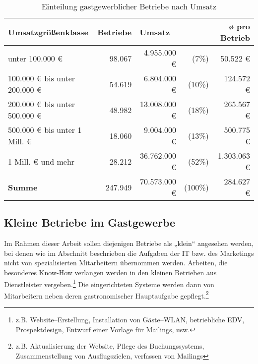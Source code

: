 \begin{table}[H]
\begin{center}
\begin{footnotesize}
\begin{tabular}{| l | r | r  r | r |}  \hline                       
  \textbf{Umsatzgrößenklasse}            & \textbf{Betriebe} & \multicolumn{2}{|l|}{\textbf{Umsatz}}  & \textbf{ø pro Betrieb} \\ \hline 
  unter 100.000 €               & 98.067   &  4.955.000 € &   (7\%) &    50.522 € \\  \hline  
  100.000 € bis unter 200.000 € & 54.619   &  6.804.000 € &  (10\%) &   124.572 € \\  \hline  
  200.000 € bis unter 500.000 € & 48.982   & 13.008.000 € &  (18\%) &   265.567 € \\  \hline  
  500.000 € bis unter 1 Mill. € & 18.060   &  9.004.000 € &  (13\%) &   500.775 € \\  \hline  
  1 Mill. € und mehr            & 28.212   & 36.762.000 € &  (52\%) & 1.303.063 € \\  \hline  
  \textbf{Summe}                         & 247.949  & 70.573.000 € & (100\%) &   284.627 € \\  \hline  
\end{tabular}
\end{footnotesize}
\caption[Einteilung gastgewerblicher Betriebe nach Umsatz]{Einteilung gastgewerblicher Betriebe nach Umsatz\protect\footnotemark}
\label{tab:betriebsgroessen}
\end{center}
\end{table}

\subsection{Kleine Betriebe im Gastgewerbe}

Im Rahmen dieser Arbeit sollen diejenigen Betriebe als „klein“ angesehen werden, bei denen wie im Abschnitt  beschrieben die Aufgaben der IT bzw. des Marketings nicht von spezialisierten Mitarbeitern übernommen werden. Arbeiten, die besonderes Know-How verlangen werden in den kleinen Betrieben aus Dienstleister vergeben.\footnote{z.B. Website–Erstellung, Installation von Gäste–WLAN, betriebliche EDV, Prospektdesign, Entwurf einer Vorlage für Mailings, usw.} Die eingerichteten Systeme werden dann von Mitarbeitern neben deren gastronomischer Hauptaufgabe gepflegt.\footnote{z.B. Aktualisierung der Website, Pflege des Buchungssystems, Zusammenstellung von Ausflugszielen, verfassen von Mailings}

